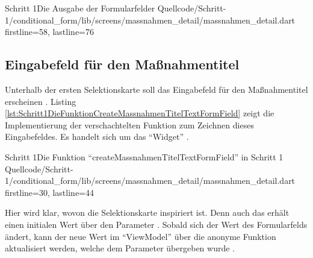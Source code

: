 \clearpage

\begin{alexlisting}{Schritt 1}{Die Ausgabe der Formularfelder}
  {Quellcode/Schritt-1/conditional_form/lib/screens/massnahmen_detail/massnahmen_detail.dart}
  {firstline=58, lastline=76}
  \label{lst:Schritt1AusgabeDerFormularfelder}
\end{alexlisting}

\subsection{Eingabefeld für den Maßnahmentitel}


Unterhalb der ersten Selektionskarte soll das Eingabefeld für den Maßnahmentitel erscheinen .
Listing \ref{lst:Schritt1DieFunktionCreateMassnahmenTitelTextFormField} zeigt die Implementierung der verschachtelten Funktion zum Zeichnen dieses Eingabefeldes.
 Es handelt sich um das \enquote{Widget}  .


\begin{alexlisting}{Schritt 1}{Die Funktion \enquote{createMassnahmenTitelTextFormField} in Schritt 1}
  {Quellcode/Schritt-1/conditional_form/lib/screens/massnahmen_detail/massnahmen_detail.dart}
  {firstline=30, lastline=44}
  \label{lst:Schritt1DieFunktionCreateMassnahmenTitelTextFormField}
\end{alexlisting}

Hier wird klar, wovon die Selektionskarte inspiriert ist.
Denn auch das  erhält einen initialen Wert über den Parameter  .
Sobald sich der Wert des Formularfelds ändert, kann der neue Wert im \enquote{ViewModel} über die anonyme Funktion aktualisiert werden,
welche dem Parameter  übergeben wurde .
